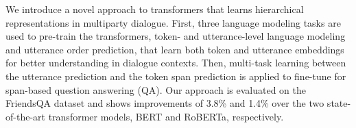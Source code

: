 We introduce a novel approach to transformers that learns hierarchical representations in multiparty dialogue. First, three language modeling tasks are used to pre-train the transformers, token- and utterance-level language modeling and utterance order prediction, that learn both token and utterance embeddings for better understanding in dialogue contexts. Then, multi-task learning between the utterance prediction and the token span prediction is applied to fine-tune for span-based question answering (QA). Our approach is evaluated on the FriendsQA dataset and shows improvements of 3.8\% and 1.4\% over the two state-of-the-art transformer models, BERT and RoBERTa, respectively.
